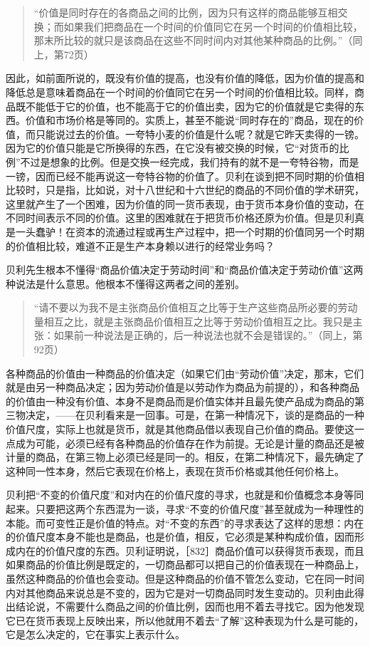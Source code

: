 \begin{quote}{“价值是同时存在的各商品之间的比例，因为只有这样的商品能够互相交换；而如果我们把商品在一个时间的价值同它在另一个时间的价值相比较，那末所比较的就只是该商品在这些不同时间内对其他某种商品的比例。”（同上，第72页）}\end{quote}

因此，如前面所说的，既没有价值的提高，也没有价值的降低，因为价值的提高和降低总是意味着商品在一个时间的价值同它在另一个时间的价值相比较。同样，商品既不能低于它的价值，也不能高于它的价值出卖，因为它的价值就是它卖得的东西。价值和市场价格是等同的。实质上，甚至不能说“同时存在的”商品，现在的价值，而只能说过去的价值。一夸特小麦的价值是什么呢？就是它昨天卖得的一镑。因为它的价值只能是它所换得的东西，在它没有被交换的时候，它“对货币的比例”不过是想象的比例。但是交换一经完成，我们持有的就不是一夸特谷物，而是一镑，因而已经不能再说这一夸特谷物的价值了。贝利在谈到把不同时期的价值相比较时，只是指，比如说，对十八世纪和十六世纪的商品的不同价值的学术研究，这里就产生了一个困难，因为价值的同一货币表现，由于货币本身价值的变动，在不同时间表示不同的价值。这里的困难就在于把货币价格还原为价值。但是贝利真是一头蠢驴！在资本的流通过程或再生产过程中，把一个时期的价值同另一个时期的价值相比较，难道不正是生产本身赖以进行的经常业务吗？

贝利先生根本不懂得“商品价值决定于劳动时间”和“商品价值决定于劳动价值”这两种说法是什么意思。他根本不懂得这两者之间的差别。

\begin{quote}{“请不要以为我不是主张商品价值相互之比等于生产这些商品所必要的劳动量相互之比，就是主张商品价值相互之比等于劳动价值相互之比。我只是主张：如果前一种说法是正确的，后一种说法也就不会是错误的。”（同上，第92页）}\end{quote}

各种商品的价值由一种商品的价值决定（如果它们由“劳动价值”决定，那末，它们就是由另一种商品决定；因为劳动价值是以劳动作为商品为前提的），和各种商品的价值由一种没有价值、本身不是商品而是价值实体并且最先使产品成为商品的第三物决定，——在贝利看来是一回事。可是，在第一种情况下，谈的是商品的一种价值尺度，实际上也就是货币，就是其他商品借以表现自己价值的商品。要使这一点成为可能，必须已经有各种商品的价值存在作为前提。无论是计量的商品还是被计量的商品，在第三物上必须已经是同一的。相反，在第二种情况下，最先确定了这种同一性本身，然后它表现在价格上，表现在货币价格或其他任何价格上。

贝利把“不变的价值尺度”和对内在的价值尺度的寻求，也就是和价值概念本身等同起来。只要把这两个东西混为一谈，寻求“不变的价值尺度”甚至就成为一种理性的本能。而可变性正是价值的特点。对“不变的东西”的寻求表达了这样的思想：内在的价值尺度本身不能也是商品，也是价值，相反，它必须是某种构成价值，因而形成内在的价值尺度的东西。贝利证明说，［832］商品价值可以获得货币表现，而且如果商品的价值比例是既定的，一切商品都可以把自己的价值表现在一种商品上，虽然这种商品的价值也会变动。但是这种商品的价值不管怎么变动，它在同一时间内对其他商品来说总是不变的，因为它是对一切商品同时发生变动的。贝利由此得出结论说，不需要什么商品之间的价值比例，因而也用不着去寻找它。因为他发现它已在货币表现上反映出来，所以他就用不着去“了解”这种表现为什么是可能的，它是怎么决定的，它在事实上表示什么。


